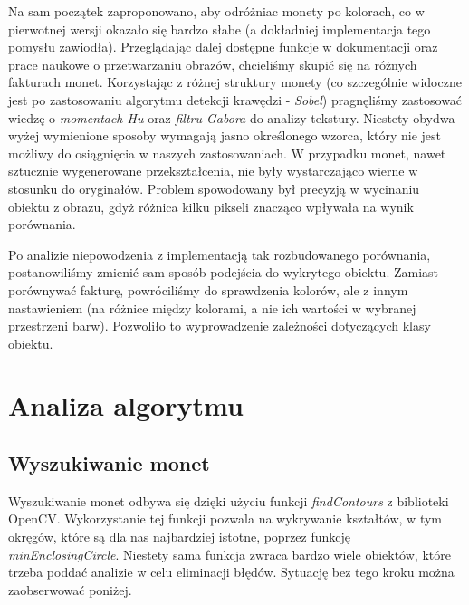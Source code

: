 \documentclass{mwart}
\begin{document}
Na sam początek zaproponowano, aby odróżniac monety po kolorach, co w pierwotnej wersji okazało się bardzo słabe (a dokładniej implementacja tego pomysłu zawiodła). Przeglądając dalej dostępne funkcje w dokumentacji oraz prace naukowe o przetwarzaniu obrazów, chcieliśmy skupić się na różnych fakturach monet. Korzystając z różnej struktury monety (co szczególnie widoczne jest po zastosowaniu algorytmu detekcji krawędzi - \textit{Sobel}) pragnęliśmy zastosować wiedzę o  \textit{momentach Hu} oraz \textit{filtru Gabora} do analizy tekstury.
Niestety obydwa wyżej wymienione sposoby wymagają jasno określonego wzorca, który nie jest możliwy do osiągnięcia w naszych zastosowaniach. W przypadku monet, nawet sztucznie wygenerowane przekształcenia, nie były wystarczająco wierne w stosunku do oryginałów. Problem spowodowany był precyzją w wycinaniu obiektu z obrazu, gdyż różnica kilku pikseli znacząco wpływała na wynik porównania.

Po analizie niepowodzenia z implementacją tak rozbudowanego porównania, postanowiliśmy zmienić sam sposób podejścia do wykrytego obiektu. Zamiast porównywać fakturę, powróciliśmy do sprawdzenia kolorów, ale z innym nastawieniem (na różnice między kolorami, a nie ich wartości w wybranej przestrzeni barw). Pozwoliło to wyprowadzenie zależności dotyczących klasy obiektu.

\section{Analiza algorytmu}
\subsection{Wyszukiwanie monet}

Wyszukiwanie monet odbywa się dzięki użyciu funkcji \textit{findContours} z biblioteki OpenCV. Wykorzystanie tej funkcji pozwala na wykrywanie kształtów, w tym okręgów, które są dla nas najbardziej istotne, poprzez funkcję \textit{minEnclosingCircle}.
Niestety sama funkcja zwraca bardzo wiele obiektów, które trzeba poddać analizie w celu eliminacji błędów. Sytuację bez tego kroku można zaobserwować poniżej.
\end{document}
